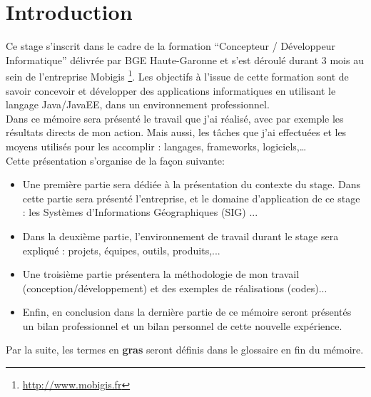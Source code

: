 \chapter{Introduction} 
\label{Introduction}

Ce stage s'inscrit dans le cadre de la formation "`Concepteur / Développeur Informatique"' délivrée par BGE Haute-Garonne et s'est déroulé durant 3 mois au sein de l'entreprise Mobigis \footnote{\url{http://www.mobigis.fr}}. Les objectifs à l'issue de cette formation sont de savoir concevoir et développer des applications informatiques en utilisant le langage Java/JavaEE, dans un environnement professionnel.\\

Dans ce mémoire sera présenté le travail que j'ai réalisé, avec par exemple les résultats directs de mon action. Mais aussi, les tâches que j'ai effectuées et les moyens utilisés pour les accomplir : langages, frameworks, logiciels,…\\
 
Cette présentation s'organise de la façon suivante:\newline

\begin{itemize}
\item Une première partie sera dédiée à la présentation du contexte du stage. Dans cette partie sera présenté l'entreprise, et le domaine d'application de ce stage : les Systèmes d'Informations Géographiques (SIG) ...\\

\item Dans la deuxième partie, l'environnement de travail durant le stage sera expliqué : projets, équipes, outils, produits,...\\

\item Une troisième partie présentera la méthodologie de mon travail (conception/développement) et des exemples de réalisations (codes)...\\

\item Enfin, en conclusion dans la dernière partie de ce mémoire seront présentés un bilan professionnel et un bilan personnel de cette nouvelle expérience.\newline

\end{itemize}

Par la suite, les termes en \textbf{gras} seront définis dans le glossaire en fin du mémoire.

